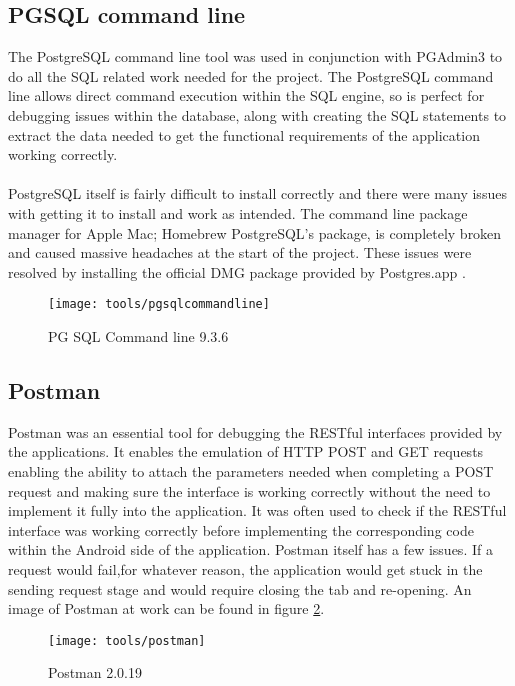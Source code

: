 \subsection*{PGSQL command line}

The PostgreSQL command line tool was used in conjunction with PGAdmin3 to do all the SQL related work needed for the project. The PostgreSQL command line allows direct command execution within the SQL engine, so is perfect for debugging issues within the database, along with creating the SQL statements to extract the data needed to get the functional requirements of the application working correctly.\\
\\
PostgreSQL itself is fairly difficult to install correctly and there were many issues with getting it to install and work as intended. The command line package manager for Apple Mac; Homebrew PostgreSQL's package, is completely broken and caused massive headaches at the start of the project. These issues were resolved by installing the official DMG package provided by Postgres.app \cite{jemt:postgresapp:2015:online}.

\begin{figure}[H]
    \centering
    \texttt{[image: tools/pgsqlcommandline]}
    \caption{PG SQL Command line 9.3.6}
    \label{fig:pg_sql_image}
\end{figure} 

\subsection*{Postman}

Postman was an essential tool for debugging the RESTful interfaces provided by the applications. It enables the emulation of HTTP POST and GET requests enabling the ability to attach the parameters needed when completing a POST request and making sure the interface is working correctly without the need to implement it fully into the application. It was often used to check if the RESTful interface was working correctly before implementing the corresponding code within the Android side of the application. Postman itself has a few issues. If a request would fail,for whatever reason, the application would get stuck in the sending request stage and would require closing the tab and re-opening. An image of Postman at work can be found in figure \ref{fig:postman_image}.

\begin{figure}[H]
    \centering
    \texttt{[image: tools/postman]}
    \caption{Postman 2.0.19}
    \label{fig:postman_image}
\end{figure} 


